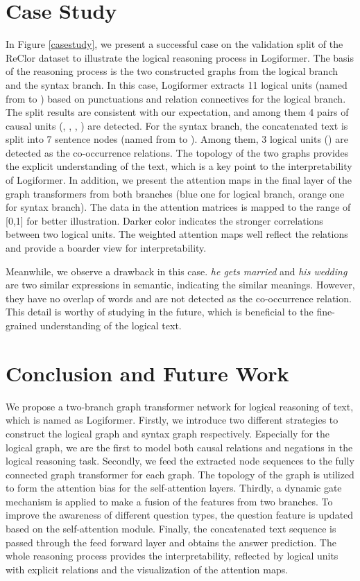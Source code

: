 \documentclass[sigconf]{acmart}
\begin{document}
\vspace{-0.1cm}
\section{Case Study}
In Figure \ref{casestudy}, we present a successful case on the validation split 
of the ReClor dataset to illustrate the logical reasoning process in 
Logiformer. The basis of the reasoning process is the two constructed graphs 
from the logical branch and the syntax branch. In this case, Logiformer 
extracts 11 logical units (named from  to ) based on punctuations and 
relation connectives for the logical branch. The split results are consistent 
with our expectation, and among them 4 pairs of causal units (, , 
, ) are detected. For the syntax branch, the concatenated text is 
split into 7 sentence nodes (named from  to ). Among them, 3 logical 
units () are detected as the co-occurrence relations. The topology of 
the two graphs provides the explicit understanding of the text, which is a key 
point to the interpretability of Logiformer. In addition, we present the 
attention maps in the final layer of the graph transformers from both branches 
(blue one for logical branch, orange one for syntax branch). The data in the 
attention matrices is mapped to the range of [0,1] for better illustration. 
Darker color indicates the stronger correlations between two logical units. The 
weighted attention maps well reflect the relations and provide a boarder view 
for interpretability.

Meanwhile, we observe a drawback in this case. \textit{he gets married} and \textit{his wedding} are two similar expressions in semantic, indicating the similar meanings. However, they have no overlap of words and are not detected as the co-occurrence relation. This detail is worthy of studying in the future, which is beneficial to the fine-grained understanding of the logical text.

\vspace{-0.1cm}
\section{Conclusion and Future Work}
We propose a two-branch graph transformer network for logical reasoning of 
text, which is named as Logiformer. Firstly, we introduce two different 
strategies to construct the logical graph and syntax graph respectively. 
Especially for the logical graph, we are the first to model both causal 
relations and negations in the logical reasoning task. Secondly, we feed the 
extracted node sequences to the fully connected graph transformer for each 
graph. The topology of the graph is utilized to form the attention bias for the 
self-attention layers. Thirdly, a dynamic gate mechanism is applied to make a 
fusion of the features from two branches. To improve the awareness of different 
question types, the question feature is updated based on the self-attention 
module. Finally, the concatenated text sequence is passed through the feed 
forward layer and obtains the answer prediction. The whole reasoning process 
provides the interpretability, reflected by logical units with explicit 
relations and the visualization of the attention maps.
\end{document}
